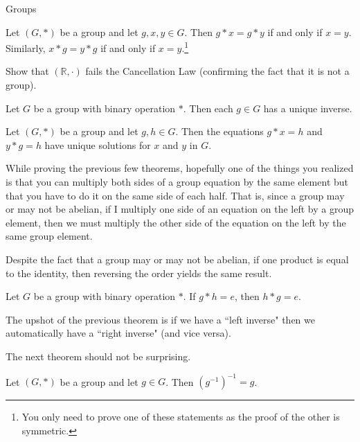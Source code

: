 \begin{section}{Groups}
\begin{theorem}
Let \((G,*)\) be a group and let \(g,x,y\in G\).  Then \(g*x=g*y\) if and only if \(x=y\).  Similarly, \(x*g=y*g\) if and only if \(x=y\).\footnote{You only need to prove one of these statements as the proof of the other is symmetric.}
\end{theorem}

\begin{exercise}
Show that \((\mathbb{R},\cdot)\) fails the Cancellation Law (confirming the fact that it is not a group).
\end{exercise}

\begin{corollary}
Let \(G\) be a group with binary operation \(*\).  Then each \(g\in G\) has a unique inverse.
\end{corollary}

\begin{theorem}\label{thm:unique_soln}
Let \((G,*)\) be a group and let \(g,h\in G\).  Then the equations \(g*x=h\) and \(y*g=h\) have unique solutions for \(x\) and \(y\) in \(G\).  
\end{theorem}

While proving the previous few theorems, hopefully one of the things you realized is that you can multiply both sides of a group equation by the same element but that you have to do it on the same side of each half.  That is, since a group may or may not be abelian, if I multiply one side of an equation on the left by a group element, then we must multiply the other side of the equation on the left by the same group element.

Despite the fact that a group may or may not be abelian, if one product is equal to the identity, then reversing the order yields the same result.

\begin{theorem}
Let \(G\) be a group with binary operation \(*\).  If \(g*h=e\), then \(h*g=e\).
\end{theorem}

The upshot of the previous theorem is if we have a ``left inverse" then we automatically have a ``right inverse" (and vice versa).

The next theorem should not be surprising.

\begin{theorem}
Let \((G,*)\) be a group and let \(g\in G\).  Then \((g^{-1})^{-1}=g\).
\end{theorem}


\end{section}
